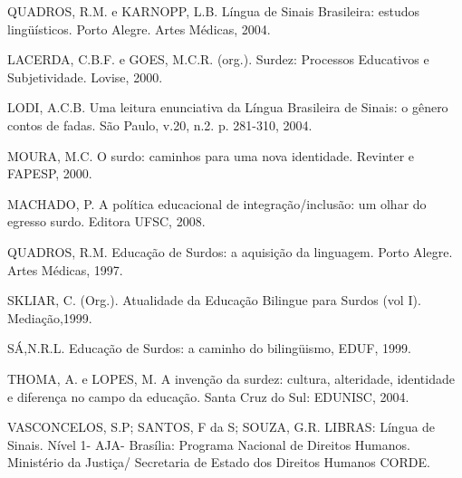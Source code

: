 {{        QUADROS, R.M. e KARNOPP, L.B. Língua de Sinais Brasileira: estudos lingüísticos. Porto Alegre. Artes Médicas, 2004.

        LACERDA, C.B.F. e GOES, M.C.R. (org.). Surdez: Processos Educativos e Subjetividade. Lovise, 2000.

        LODI, A.C.B. Uma leitura enunciativa da Língua Brasileira de Sinais: o gênero contos de fadas. São Paulo, v.20, n.2. p. 281-310, 2004.

        MOURA, M.C. O surdo: caminhos para uma nova identidade. Revinter e FAPESP, 2000.

        MACHADO, P. A política educacional de integração/inclusão: um olhar do egresso surdo. Editora UFSC, 2008.

        QUADROS, R.M. Educação de Surdos: a aquisição da linguagem. Porto Alegre. Artes Médicas, 1997.

        SKLIAR, C. (Org.). Atualidade da Educação Bilingue para Surdos (vol I). Mediação,1999.

        SÁ,N.R.L. Educação de Surdos: a caminho do bilingüismo, EDUF, 1999.

        THOMA, A. e LOPES, M. A invenção da surdez: cultura, alteridade, identidade e diferença no campo da educação. Santa Cruz do Sul: EDUNISC, 2004.

        VASCONCELOS, S.P; SANTOS, F da S; SOUZA, G.R. LIBRAS: Língua de Sinais. Nível 1- AJA- Brasília: Programa Nacional de Direitos Humanos. Ministério da Justiça/ Secretaria de Estado dos Direitos Humanos CORDE.
    }
}
